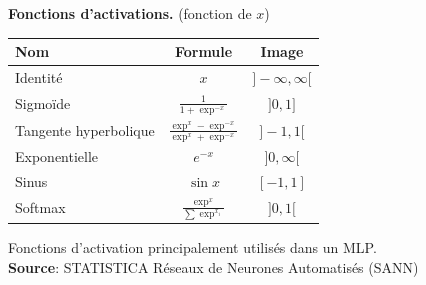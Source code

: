 \begin{figure}
 \centering
 \textbf{Fonctions d'activations.} (fonction de $x$)\\
 \begin{tabular}{|l|c|c|}
  Nom & Formule & Image\\
  \hline
  Identité & $x$ & $]-\infty,\infty[$\\
  \hline
  Sigmoïde & $\frac{1}{1+\exp^{-x}}$ & $]0,1]$\\
  \hline
  Tangente hyperbolique & $\frac{\exp^{x}-\exp^{-x}}{\exp^{x}+\exp^{-x}}$ & $]-1,1[$\\
  \hline
  Exponentielle & $e^{-x}$ & $]0,\infty[$\\
  \hline
  Sinus & $\sin{x}$ & $[-1,1]$\\
  \hline
  Softmax & $\frac{\exp^{x}}{\sum{\exp^{x_i}}}$ & $]0,1[$\\
  \hline
 \end{tabular}

 \caption{Fonctions d'activation principalement utilisés dans un MLP. \textbf{Source}: STATISTICA Réseaux de Neurones Automatisés (SANN)\cite{statistica}}
 \label{mlpfonc}
\end{figure}
